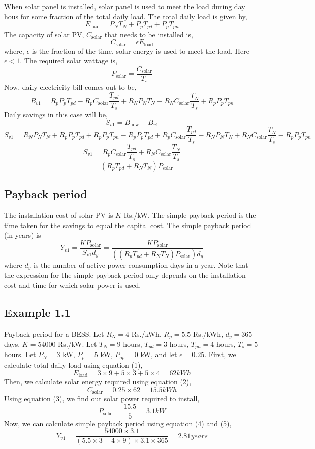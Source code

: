 \documentclass{article}
\begin{document}
When solar panel is installed, solar panel is used to meet the load during day hous for some fraction of the total daily load.
The total daily load is given by,
\[
E_{\text{load}} = P_N T_N + P_{p} T_{pd} + P_{p} T_{pn} \tag{1}   
\]
The capacity of solar PV, \( C_{\text{solar}} \) that needs to be installed is,
\[
C_{\text{solar}} = \epsilon E_{\text{load}} \tag{2}
\]
where, \( \epsilon \) is the fraction of the time, solar energy is used to meet the load. Here \( \epsilon < 1 \).
The required solar wattage is,
\[
P_{\text{solar}} = \frac{C_{\text{solar}}}{T_s} \tag{3}
\]
Now, daily electricity bill comes out to be,
\[
B_{v1} = R_p P_p T_{pd} - R_p C_{\text{solar}} \frac{T_{pd}}{T_s}
       + R_N P_N T_N - R_N C_{\text{solar}} \frac{T_{N}}{T_s}
       + R_p P_p T_{pn}
\]
Daily savings in this case will be,
\[
S_{v1} = B_{\text{now}} - B_{v1}
\]
\[
S_{v1} = R_N P_N T_N + R_p P_{p} T_{pd} + R_p P_{p} T_{pn} - R_p P_p T_{pd} + R_p C_{\text{solar}} \frac{T_{pd}}{T_s}
       - R_N P_N T_N + R_N C_{\text{solar}} \frac{T_{N}}{T_s}
       - R_p P_p T_{pn} 
\]
\[
S_{v1} = R_p C_{\text{solar}} \frac{T_{pd}}{T_s} + R_N C_{\text{solar}} \frac{T_{N}}{T_s}
\]
\[
       = (R_p T_{pd} + R_N T_N) P_{\text{solar}} \tag{4}
\]

\subsection{Payback period}
The installation cost of solar PV is \( K \) Rs./kW. The simple payback period is the time taken for the savings to equal the capital cost. The simple payback period (in years) is
\[
Y_{v1} = \frac{K P_{\text{solar}}}{S_{v1} d_y} 
       = \frac{K P_{\text{solar}}}{((R_p T_{pd} + R_N T_N) P_{\text{solar}}) d_y} \tag{5}
\]
where \( d_y \) is the number of active power consumption days in a year. Note that
the expression for the simple payback period only depends on the installation cost and time for which solar power is used. 

\subsection{Example 1.1}
Payback period for a BESS. Let \( R_N = 4 \) Rs./kWh, \( R_p = 5.5 \) Rs./kWh,
\( d_y = 365 \) days, \( K = 54000 \) Rs./kW. Let \( T_N = 9 \) hours, \( T_{pd} = 3 \) hours, \( T_{pn} = 4 \) hours, \( T_s = 5 \) hours. 
Let \( P_N = 3 \) kW, \( P_p = 5 \) kW, \( P_{op} = 0 \) kW, and let \( \epsilon = 0.25\).
First, we calculate total daily load using equation (1),
\[
E_{\text{load}} = 3 \times 9 + 5 \times 3 + 5 \times 4  
                = 62 kWh 
\]
Then, we calculate solar energy required using equation (2),
\[
C_{\text{solar}} =  0.25 \times 62 
                 =  15.5 kWh 
\]
Using equation (3), we find out solar power required to install,
\[
P_{\text{solar}} = \frac{15.5}{5}
                 = 3.1 kW
\]
Now, we can calculate simple payback period using equation (4) and (5), 
\[
Y_{v1} = \frac{54000 \times 3.1}{(5.5 \times 3 + 4 \times 9) \times 3.1 \times 365}
       = 2.81 years
\]
\end{document}
